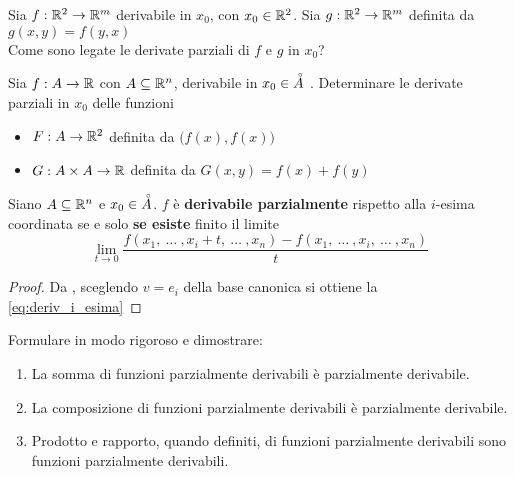 \begin{exercise}
	Sia $f:\mathbb{R}^2 \to \mathbb{R}^m$ derivabile in $x_0$, con $x_0 \in \mathbb{R}^2$. Sia $g:\mathbb{R}^2 \to \mathbb{R}^m$ definita da $g(x,y) = f(y,x)$\\
	Come sono legate le derivate parziali di $f$ e $g$ in $x_0$?
\end{exercise}
\begin{exercise}
	Sia $f:A \to \mathbb{R}$ con $A \subseteq \mathbb{R}^n$, derivabile in $x_0 \in \accentset{\circ}{A}$ . Determinare le derivate parziali in $x_0$ delle funzioni
	\begin{itemize}
		\item $F:A \to \mathbb{R}^2$ definita da $\bigl( f(x), f(x) \bigr)$
		\item $G:A \times A \to \mathbb{R}$ definita da $G(x,y) = f(x) + f(y)$
	\end{itemize}
\end{exercise}
\begin{proposition}
	Siano $A \subseteq \mathbb{R}^n$ e $x_0 \in \accentset{\circ}{A}$. $f$ è \textbf{derivabile parzialmente} rispetto alla $i$-esima coordinata se e solo \textbf{se esiste} finito il limite
	\begin{equation}
		\label{eq:deriv_i_esima}
		\lim\limits_{t \to 0} \frac{f(x_1,\:\dotsc\:,x_i+t,\:\dotsc\:,x_n) - f(x_1,\:\dotsc\:,x_i,\:\dotsc\:,x_n)}{t}
	\end{equation}
	\begin{proof}
		Da , sceglendo $v = e_i$ della base canonica si ottiene la \cref{eq:deriv_i_esima}
	\end{proof}
\end{proposition}
\begin{exercise}
	\label{ex:funz_derivabili}
	Formulare in modo rigoroso e dimostrare:
	\begin{enumerate}
		\item La somma di funzioni parzialmente derivabili è parzialmente derivabile.
		\item La composizione di funzioni parzialmente derivabili è parzialmente derivabile.
		\item Prodotto e rapporto, quando definiti, di funzioni parzialmente derivabili sono funzioni parzialmente derivabili.
	\end{enumerate}
\end{exercise}
